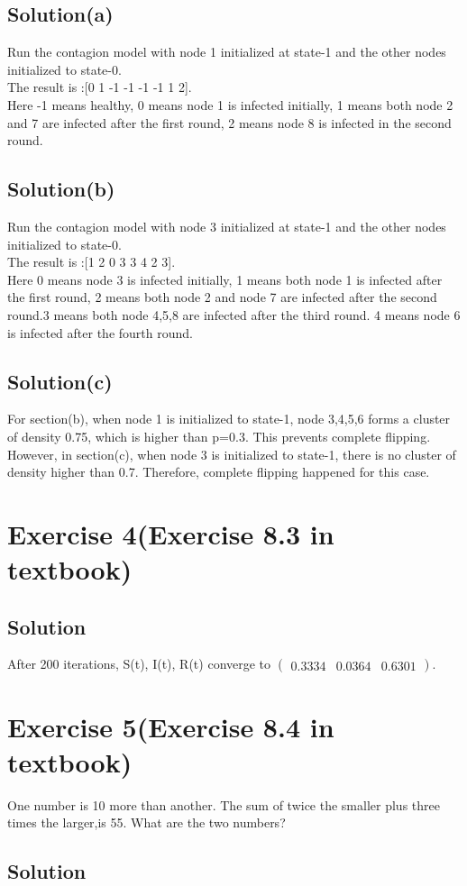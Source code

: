 \documentclass[12pt]{article}%
\begin{document}
\subsection{Solution(a)}
Run the contagion model with node 1 initialized at state-1 and the other nodes initialized to state-0.\\
The result is :[0  1 -1 -1 -1 -1  1  2]. \\Here -1 means healthy, 0 means node 1 is infected initially, 1 means both node 2 and 7 are infected after the first round, 2 means node 8 is infected in the second round.
\subsection{Solution(b)}
Run the contagion model with node 3 initialized at state-1 and the other nodes initialized to state-0.\\
The result is :[1 2 0 3 3 4 2 3].\\ Here 0 means node 3 is infected initially, 1 means both node 1 is infected after the first round, 2 means both node 2 and node 7 are infected after the second round.3 means both node 4,5,8 are infected after the third round. 4 means node 6 is infected after the fourth round.
\subsection{Solution(c)} 
For section(b), when node 1 is initialized to state-1, node 3,4,5,6 forms a cluster of density 0.75, which is higher than p=0.3. This prevents complete flipping. However, in section(c), when node 3 is initialized to state-1, there is no cluster of density higher than 0.7. Therefore, complete flipping happened for this case.
\section{Exercise 4(Exercise 8.3 in textbook)}     
\subsection{Solution}
After 200 iterations, S(t), I(t), R(t) converge to $\left(\begin{matrix}0.3334&0.0364&0.6301\end{matrix}\right)$. 

\section{Exercise 5(Exercise 8.4 in textbook)}

One number is 10 more than another. The sum of twice the smaller plus three times the larger,is 55. What are the two numbers?

\subsection{Solution}
\end{document}
